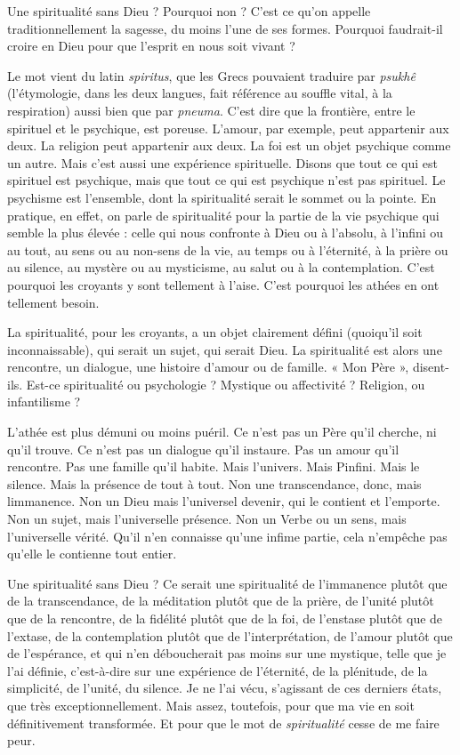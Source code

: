 Une spiritualité sans Dieu ? Pourquoi non ? C’est ce qu’on appelle traditionnellement
la sagesse, du moins l’une de ses formes. Pourquoi faudrait-il
croire en Dieu pour que l'esprit en nous soit vivant ?

Le mot vient du latin {\it spiritus}, que les Grecs pouvaient traduire par {\it psukhê}
(l’étymologie, dans les deux langues, fait référence au souffle vital, à la respiration)
aussi bien que par {\it pneuma}. C’est dire que la frontière, entre le spirituel et
le psychique, est poreuse. L'amour, par exemple, peut appartenir aux deux. La
religion peut appartenir aux deux. La foi est un objet psychique comme un
autre. Mais c’est aussi une expérience spirituelle. Disons que tout ce qui est spirituel
est psychique, mais que tout ce qui est psychique n’est pas spirituel. Le
psychisme est l’ensemble, dont la spiritualité serait le sommet ou la pointe. En
pratique, en effet, on parle de spiritualité pour la partie de la vie psychique qui
semble la plus élevée : celle qui nous confronte à Dieu ou à l’absolu, à l'infini
ou au tout, au sens ou au non-sens de la vie, au temps ou à l'éternité, à la prière
ou au silence, au mystère ou au mysticisme, au salut ou à la contemplation.
C’est pourquoi les croyants y sont tellement à l’aise. C’est pourquoi les athées
en ont tellement besoin.

La spiritualité, pour les croyants, a un objet clairement défini (quoiqu'il
soit inconnaissable), qui serait un sujet, qui serait Dieu. La spiritualité est alors
une rencontre, un dialogue, une histoire d’amour ou de famille. « Mon Père »,
disent-ils. Est-ce spiritualité ou psychologie ? Mystique ou affectivité ? Religion,
ou infantilisme ?

L’athée est plus démuni ou moins puéril. Ce n’est pas un Père qu’il
cherche, ni qu’il trouve. Ce n’est pas un dialogue qu’il instaure. Pas un amour
qu'il rencontre. Pas une famille qu’il habite. Mais l’univers. Mais Pinfini. Mais
le silence. Mais la présence de tout à tout. Non une transcendance, donc, mais
limmanence. Non un Dieu mais l’universel devenir, qui le contient et l’emporte.
Non un sujet, mais l’universelle présence. Non un Verbe ou un sens,
mais l’universelle vérité. Qu'il n’en connaisse qu’une infime partie, cela
n'empêche pas qu’elle le contienne tout entier.

Une spiritualité sans Dieu ? Ce serait une spiritualité de l’immanence
plutôt que de la transcendance, de la méditation plutôt que de la prière, de
l'unité plutôt que de la rencontre, de la fidélité plutôt que de la foi, de l’enstase
plutôt que de l’extase, de la contemplation plutôt que de l'interprétation, de
l'amour plutôt que de l’espérance, et qui n’en déboucherait pas moins sur une
mystique, telle que je l’ai définie, c’est-à-dire sur une expérience de l'éternité,
de la plénitude, de la simplicité, de l’unité, du silence. Je ne l’ai vécu, s’agissant
de ces derniers états, que très exceptionnellement. Mais assez, toutefois,
pour que ma vie en soit définitivement transformée. Et pour que le mot de {\it spiritualité}
cesse de me faire peur.

